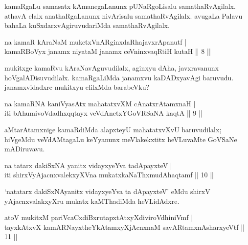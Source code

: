 \begin{artha}
kamaRgaLu samasatx kAmanegaLanunx pUNaRgoLisalu samathaRvAgilalx. 
athavA elalx anathaRgaLanunx nivArisalu samathaRvAgilalx. avugaLa 
Palavu bahaLa kuSxdarxvAgiruvudariMda samathaRvAgilalx.
\end{artha}


\begin{shl}
na kamaR kAraNaM muketxVnARginxdaRhajavxrApanutf | \\
kamaRBoVyx janamx niyataM janamx ceVninxvaqRtiH kutaH \hfill|| 8 || 
\end{shl}

\begin{artha}
mukitxge kamaRvu kAraNavAguvudilalx, aginxyu dAha, javxravanunx 
hoVgalADisuvudilalx. kamaRgaLiMda janamxvu kaDADxyavAgi baruvudu. 
janamxvidadxre mukitxyu elilxMda barabeVku?
\end{artha}


\begin{shl}
na kamaRNA kaniVyasAtx mahatatxvXM cAnatxrAtamxnaH | \\
iti bAhumivoVdadhxqqtayx veVdAnetxYGoVRSaNA kaqtA \hfill|| 9  || 
\end{shl}

\begin{artha}
aMtarAtamxnige kamaRdiMda alapxteyU mahatatxvXvU baruvudilalx; hiVgeMdu veVdAMtagaLu keYyanunx meVlakekxtitx heVLuvaMte GoVSaNe mADiruvavu.
\end{artha}


\begin{shl}
na tatarx dakiSxNA yanitx vidayxyeYva tadApayxteV | \\
iti shirxVyAjacnxvalekxyXVna mukatxkaNaThxmudAhaqtamf \hfill || 10 || 
\end{shl}

\begin{artha}
`natatarx dakiSxNAyanitx vidayxyeYva ta dApayxteV' eMdu shirxV yAjacnxvalakxyXru mukatx kaMThadiMda heVLidAdxre.
\end{artha}

\begin{shl}
atoV mukitxM pariVcaCxdiBxrutapxtAtxyXdiviroVdhiniVmf | \\
tayxkAtxvX kamARNayxtheYkAtamxyXjAcnxnaM savARtamxnA\s \s sharxyeVtf \hfill|| 11 || 
\end{shl}

